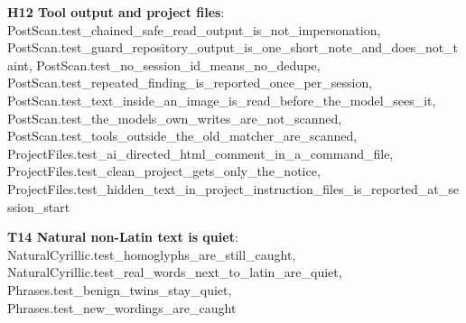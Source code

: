 \documentclass[10pt,a4paper]{article}
\begin{document}
\textbf{H12 Tool output and project files}: \textcolor{ok}{PostScan.\allowbreak{}test\_\allowbreak{}chained\_\allowbreak{}safe\_\allowbreak{}read\_\allowbreak{}output\_\allowbreak{}is\_\allowbreak{}not\_\allowbreak{}impersonation}, \textcolor{ok}{PostScan.\allowbreak{}test\_\allowbreak{}guard\_\allowbreak{}repository\_\allowbreak{}output\_\allowbreak{}is\_\allowbreak{}one\_\allowbreak{}short\_\allowbreak{}note\_\allowbreak{}and\_\allowbreak{}does\_\allowbreak{}not\_\allowbreak{}taint}, \textcolor{ok}{PostScan.\allowbreak{}test\_\allowbreak{}no\_\allowbreak{}session\_\allowbreak{}id\_\allowbreak{}means\_\allowbreak{}no\_\allowbreak{}dedupe}, \textcolor{ok}{PostScan.\allowbreak{}test\_\allowbreak{}repeated\_\allowbreak{}finding\_\allowbreak{}is\_\allowbreak{}reported\_\allowbreak{}once\_\allowbreak{}per\_\allowbreak{}session}, \textcolor{ok}{PostScan.\allowbreak{}test\_\allowbreak{}text\_\allowbreak{}inside\_\allowbreak{}an\_\allowbreak{}image\_\allowbreak{}is\_\allowbreak{}read\_\allowbreak{}before\_\allowbreak{}the\_\allowbreak{}model\_\allowbreak{}sees\_\allowbreak{}it}, \textcolor{ok}{PostScan.\allowbreak{}test\_\allowbreak{}the\_\allowbreak{}models\_\allowbreak{}own\_\allowbreak{}writes\_\allowbreak{}are\_\allowbreak{}not\_\allowbreak{}scanned}, \textcolor{ok}{PostScan.\allowbreak{}test\_\allowbreak{}tools\_\allowbreak{}outside\_\allowbreak{}the\_\allowbreak{}old\_\allowbreak{}matcher\_\allowbreak{}are\_\allowbreak{}scanned}, \textcolor{ok}{ProjectFiles.\allowbreak{}test\_\allowbreak{}ai\_\allowbreak{}directed\_\allowbreak{}html\_\allowbreak{}comment\_\allowbreak{}in\_\allowbreak{}a\_\allowbreak{}command\_\allowbreak{}file}, \textcolor{ok}{ProjectFiles.\allowbreak{}test\_\allowbreak{}clean\_\allowbreak{}project\_\allowbreak{}gets\_\allowbreak{}only\_\allowbreak{}the\_\allowbreak{}notice}, \textcolor{ok}{ProjectFiles.\allowbreak{}test\_\allowbreak{}hidden\_\allowbreak{}text\_\allowbreak{}in\_\allowbreak{}project\_\allowbreak{}instruction\_\allowbreak{}files\_\allowbreak{}is\_\allowbreak{}reported\_\allowbreak{}at\_\allowbreak{}session\_\allowbreak{}start}\par
\textbf{T14 Natural non-Latin text is quiet}: \textcolor{ok}{NaturalCyrillic.\allowbreak{}test\_\allowbreak{}homoglyphs\_\allowbreak{}are\_\allowbreak{}still\_\allowbreak{}caught}, \textcolor{ok}{NaturalCyrillic.\allowbreak{}test\_\allowbreak{}real\_\allowbreak{}words\_\allowbreak{}next\_\allowbreak{}to\_\allowbreak{}latin\_\allowbreak{}are\_\allowbreak{}quiet}, \textcolor{ok}{Phrases.\allowbreak{}test\_\allowbreak{}benign\_\allowbreak{}twins\_\allowbreak{}stay\_\allowbreak{}quiet}, \textcolor{ok}{Phrases.\allowbreak{}test\_\allowbreak{}new\_\allowbreak{}wordings\_\allowbreak{}are\_\allowbreak{}caught}\par
\end{document}
